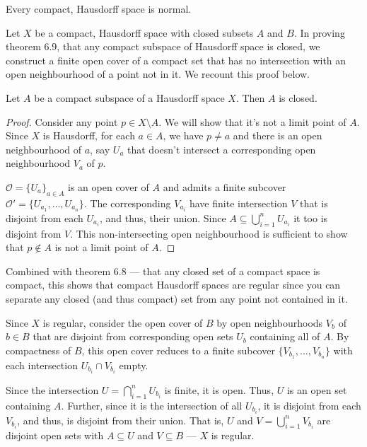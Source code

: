 \documentclass[12 pt, letterpaper]{hmcpset}
\begin{document}
\begin{problem}[6.12]
	Every compact, Hausdorff space is normal.
\end{problem}

\begin{solution}
	Let $X$ be a compact, Hausdorff space with closed subsets $A$ and $B$. In proving theorem 6.9, that any compact subspace of Hausdorff space is closed, we construct a finite open cover of a compact set that has no intersection with an open neighbourhood of a point not in it. We recount this proof below.

	\begin{theorem}[6.9]
		Let $A$ be a compact subspace of a Hausdorff space $X$. Then $A$ is closed.
	\end{theorem}

	\begin{proof}
		Consider any point $p \in {X \setminus A}$. We will show that it's not a limit point of $A$. Since $X$ is Hausdorff, for each $a \in A$, we have $p \neq a$ and there is an open neighbourhood of $a$, say $U_{a}$ that doesn't intersect a corresponding open neighbourhood $V_{a}$ of $p$.

$\mathcal{O} = \{ U_{a} \}_{a \in A}$ is an open cover of $A$ and admits a finite subcover $\mathcal{O}' = \{ U_{a_{1}}, \dots, U_{a_{n}} \}$. The corresponding $V_{a_{i}}$ have finite intersection $V$ that is disjoint from each $U_{a_{i}}$, and thus, their union. Since $A \subseteq \bigcup_{i = 1}^n U_{a_{i}}$ it too is disjoint from $V$. This non-intersecting open neighbourhood is sufficient to show that $p \not\in A$ is not a limit point of $A$.
	\end{proof}

	Combined with theorem 6.8 --- that any closed set of a compact space is compact, this shows that compact Hausdorff spaces are regular since you can separate any closed (and thus compact) set from any point not contained in it.

	Since $X$ is regular, consider the open cover of $B$ by open neighbourhoods $V_{b}$ of $b \in B$ that are disjoint from corresponding open sets $U_{b}$ containing all of $A$. By compactness of $B$, this open cover reduces to a finite subcover $\{ V_{b_{1}}, \dots, V_{b_{n}} \}$ with each intersection $U_{b_{i}} \cap V_{b_{i}}$ empty.

	Since the intersection $U = \bigcap_{i = 1}^{n} U_{b_{i}}$ is finite, it is open. Thus, $U$ is an open set containing $A$. Further, since it is the intersection of all $U_{b_{i}}$, it is disjoint from each $V_{b_{i}}$, and thus, is disjoint from their union. That is, $U$ and $V = \bigcup_{i = 1}^{n} V_{b_{i}}$ are disjoint open sets with $A \subseteq U$ and $V \subseteq B$ --- $X$ is regular.
\end{solution}
\end{document}
